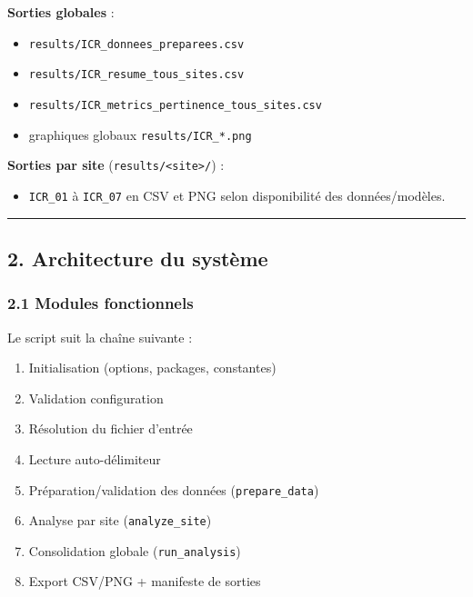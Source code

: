 \textbf{Sorties globales} :

\begin{itemize}
\tightlist
\item
  \texttt{results/ICR\_donnees\_preparees.csv}
\item
  \texttt{results/ICR\_resume\_tous\_sites.csv}
\item
  \texttt{results/ICR\_metrics\_pertinence\_tous\_sites.csv}
\item
  graphiques globaux \texttt{results/ICR\_*.png}
\end{itemize}

\textbf{Sorties par site}
(\texttt{results/\textless{}site\textgreater{}/}) :

\begin{itemize}
\tightlist
\item
  \texttt{ICR\_01} à \texttt{ICR\_07} en CSV et PNG selon disponibilité
  des données/modèles.
\end{itemize}

\begin{center}\rule{0.5\linewidth}{0.5pt}\end{center}

\subsection{2. Architecture du
système}\label{architecture-du-systuxe8me}

\subsubsection{2.1 Modules fonctionnels}\label{modules-fonctionnels}

Le script suit la chaîne suivante :

\begin{enumerate}
\def\labelenumi{\arabic{enumi}.}
\tightlist
\item
  Initialisation (options, packages, constantes)
\item
  Validation configuration
\item
  Résolution du fichier d'entrée
\item
  Lecture auto-délimiteur
\item
  Préparation/validation des données (\texttt{prepare\_data})
\item
  Analyse par site (\texttt{analyze\_site})
\item
  Consolidation globale (\texttt{run\_analysis})
\item
  Export CSV/PNG + manifeste de sorties
\end{enumerate}

